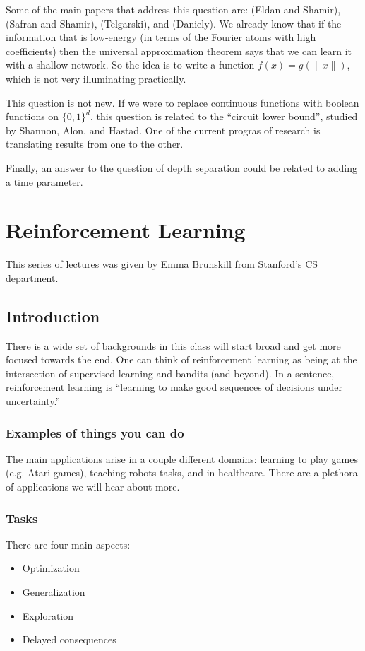 \documentclass[12pt]{article}
\begin{document}
Some of the main papers that address this question are: (Eldan and Shamir), (Safran and Shamir), (Telgarski), and (Daniely). We already know that if the information that is low-energy (in terms of the Fourier atoms with high coefficients) then 
the universal approximation theorem says that we can learn it with a shallow network. So the idea is to write a function $f(x)=g(\|x\|)$, which is not very illuminating practically.

This question is not new. If we were to replace continuous functions with boolean functions on $\{0,1\}^d$, this question is related to the ``circuit lower bound'', 
studied by Shannon, Alon, and Hastad. One of the current progras of research is translating results from one to the other.

Finally, an answer to the question of depth separation could be related to adding a time parameter.



\section{Reinforcement Learning}
This series of lectures was given by Emma Brunskill from Stanford's CS department.

\subsection{Introduction}
There is a wide set of backgrounds in this class will start broad and get more focused towards the end. One can think of reinforcement learning as being at the intersection of supervised learning and bandits (and beyond). In a sentence, 
reinforcement learning is ``learning to make good sequences of decisions under uncertainty.''

\subsubsection{Examples of things you can do}
The main applications arise in a couple different domains: learning to play games (e.g. Atari games), teaching robots tasks, and in healthcare.
There are a plethora of applications we will hear about more.

\subsubsection{Tasks}
There are four main aspects:
\begin{itemize}
	\item Optimization
	\item Generalization
	\item Exploration 
	\item Delayed consequences
\end{itemize}
\end{document}
